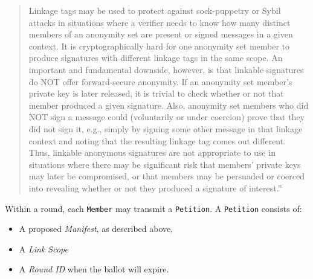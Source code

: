 \begin{quote}
Linkage tags may be used to protect against sock-puppetry or Sybil attacks in
situations where a verifier needs to know how many distinct members of an
anonymity set are present or signed messages in a given context. It is
cryptographically hard for one anonymity set member to produce signatures with
different linkage tags in the same scope. An important and fundamental downside,
however, is that linkable signatures do NOT offer forward-secure anonymity. If
an anonymity set member's private key is later released, it is trivial to check
whether or not that member produced a given signature. Also, anonymity set
members who did NOT sign a message could (voluntarily or under coercion) prove
that they did not sign it, e.g., simply by signing some other message in that
linkage context and noting that the resulting linkage tag comes out different.
Thus, linkable anonymous signatures are not appropriate to use in situations
where there may be significant risk that members' private keys may later be
compromised, or that members may be persuaded or coerced into revealing whether
or not they produced a signature of interest.''
\end{quote}
\cite{golrs}

%

Within a round, each \texttt{Member} may  transmit a \texttt{Petition}. A
\texttt{Petition} consists of:
\begin{itemize}
  \item A proposed \emph{Manifest}, as described above,
  \item A \emph{Link Scope}
  \item A \emph{Round ID} when the ballot will expire.
\end{itemize}

